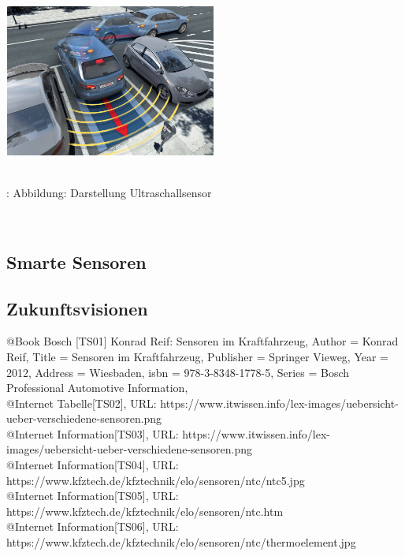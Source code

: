 					\begin{center}
						\includegraphics[width=7cm, height=5cm] {ultraschall.png}
						\caption {\\\cite{TS33}: Abbildung: Darstellung Ultraschallsensor}
					\end{center}\\
					
				
				
		\subsection{Smarte Sensoren} 
		\subsection{Zukunftsvisionen} 
 
@Book{ 
	Bosch [TS01] 
	Konrad Reif: 		Sensoren im Kraftfahrzeug,
	Author		= 		Konrad Reif,
	Title		=		Sensoren im Kraftfahrzeug,
	Publisher	=		Springer Vieweg,
	Year		=		2012,
	Address		=		Wiesbaden,
	isbn 		= 		978-3-8348-1778-5,
	Series 		=		{Bosch Professional Automotive Information},
}
\\

@Internet{ Tabelle[TS02],
URL: https://www.itwissen.info/lex-images/uebersicht-ueber-verschiedene-sensoren.png}
\\

@Internet{ Information[TS03],
	URL: https://www.itwissen.info/lex-images/uebersicht-ueber-verschiedene-sensoren.png}
\\

@Internet{ Information[TS04],
	URL: https://www.kfztech.de/kfztechnik/elo/sensoren/ntc/ntc5.jpg}
\\

@Internet{ Information[TS05],
	URL: https://www.kfztech.de/kfztechnik/elo/sensoren/ntc.htm}
\\

@Internet{ Information[TS06],
	URL: https://www.kfztech.de/kfztechnik/elo/sensoren/ntc/thermoelement.jpg}
\\

